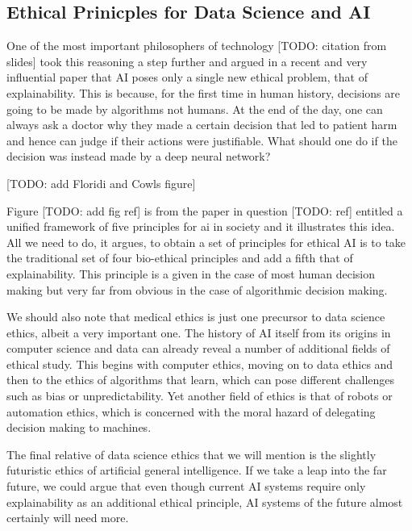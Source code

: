 \documentclass[
]{book}
\theoremstyle{definition}
\theoremstyle{definition}
\theoremstyle{definition}
\theoremstyle{definition}
\theoremstyle{remark}
\begin{document}
\hypertarget{ethical-prinicples-for-data-science-and-ai}{%
\subsection{Ethical Prinicples for Data Science and AI}\label{ethical-prinicples-for-data-science-and-ai}}

One of the most important philosophers of technology {[}TODO: citation from slides{]} took this reasoning a step further and argued in a recent and very influential paper that AI poses only a single new ethical problem, that of explainability. This is because, for the first time in human history, decisions are going to be made by algorithms not humans. At the end of the day, one can always ask a doctor why they made a certain decision that led to patient harm and hence can judge if their actions were justifiable. What should one do if the decision was instead made by a deep neural network?

{[}TODO: add Floridi and Cowls figure{]}

Figure {[}TODO: add fig ref{]} is from the paper in question {[}TODO: ref{]} entitled a unified framework of five principles for ai in society and it illustrates this idea. All we need to do, it argues, to obtain a set of principles for ethical AI is to take the traditional set of four bio-ethical principles and add a fifth that of explainability. This principle is a given in the case of most human decision making but very far from obvious in the case of algorithmic decision making.

We should also note that medical ethics is just one precursor to data science ethics, albeit a very important one. The history of AI itself from its origins in computer science and data can already reveal a number of additional fields of ethical study. This begins with computer ethics, moving on to data ethics and then to the ethics of algorithms that learn, which can pose different challenges such as bias or unpredictability. Yet another field of ethics is that of robots or automation ethics, which is concerned with the moral hazard of delegating decision making to machines.

The final relative of data science ethics that we will mention is the slightly futuristic ethics of artificial general intelligence. If we take a leap into the far future, we could argue that even though current AI systems require only explainability as an additional ethical principle, AI systems of the future almost certainly will need more.
\end{document}
